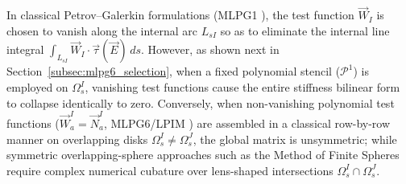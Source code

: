 \documentclass[VANCOUVER,Times1COL]{WileyNJD-v5}
\begin{document}
In classical Petrov--Galerkin formulations (MLPG1 \cite{atluri1998new, atluri2002meshless}), the test function $\vec{W}_I$ is chosen to vanish along the internal arc $L_{sI}$ so as to eliminate the internal line integral $\int_{L_{sI}} \vec{W}_I \cdot \vec{\tau}(\vec{E}) \, ds$. However, as shown next in Section~\ref{subsec:mlpg6_selection}, when a fixed polynomial stencil ($\mathcal{P}^1$) is employed on $\Omega_s^I$, vanishing test functions cause the entire stiffness bilinear form to collapse identically to zero. Conversely, when non-vanishing polynomial test functions ($\vec{W}_a^I = \vec{N}_a^I$, MLPG6/LPIM \cite{liu2001local, liu2005introduction, nicomedes2012meshless}) are assembled in a classical row-by-row manner on overlapping disks $\Omega_s^I \ne \Omega_s^J$, the global matrix is unsymmetric; while symmetric overlapping-sphere approaches such as the Method of Finite Spheres \cite{de2000method, nicomedes2021acoustic} require complex numerical cubature over lens-shaped intersections $\Omega_s^I \cap \Omega_s^J$.
\end{document}
